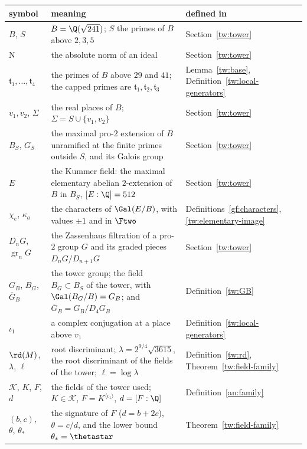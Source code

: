 \smallskip
{\small
\begin{longtable}{@{}>{\raggedright\arraybackslash}p{}>{\raggedright\arraybackslash}p{}>{\raggedright\arraybackslash}p{}@{}}
\toprule
symbol & meaning & defined in\\
\midrule\endhead
$B$, $S$ & $B=\Q(\sqrt{241})$; $S$ the primes of $B$ above $2,3,5$ & Section~\ref{tw:tower}\\
$\mathrm N$ & the absolute norm of an ideal & Section~\ref{tw:tower}\\
$\mathfrak t_1,\dots,\mathfrak t_4$ & the primes of $B$ above $29$ and $41$; the capped primes are $\mathfrak t_1,\mathfrak t_2,\mathfrak t_3$ & Lemma~\ref{tw:base}, Definition~\ref{tw:local-generators}\\
$v_1,v_2$, $\Sigma$ & the real places of $B$; $\Sigma=S\cup\{v_1,v_2\}$ & Section~\ref{tw:tower}\\
$B_S$, $G_S$ & the maximal pro-$2$ extension of $B$ unramified at the finite primes outside $S$, and its Galois group & Section~\ref{tw:tower}\\
$E$ & the Kummer field: the maximal elementary abelian $2$-extension of $B$ in $B_S$, $[E:\Q]=512$ & Section~\ref{tw:tower}\\
$\chi_e$, $\kappa_a$ & the characters of $\Gal(E/B)$, with values $\pm1$ and in $\Ftwo$ & Definitions~\ref{gf:characters}, \ref{tw:elementary-image}\\
$D_nG$, $\operatorname{gr}_nG$ & the Zassenhaus filtration of a pro-$2$ group $G$ and its graded pieces $D_nG/D_{n+1}G$ & Section~\ref{tw:tower}\\
$G_B$, $B_G$, $\overline G_B$ & the tower group; the field $B_G\subset B_S$ of the tower, with $\Gal(B_G/B)=G_B$; and $\overline G_B=G_B/D_4G_B$ & Definition~\ref{tw:GB}\\
$\iota_1$ & a complex conjugation at a place above $v_1$ & Definition~\ref{tw:local-generators}\\
$\rd(M)$, $\lambda$, $\ell$ & root discriminant; $\lambda=2^{9/4}\sqrt{3615}$, the root discriminant of the fields of the tower; $\ell=\log\lambda$ & Definition~\ref{tw:rd}, Theorem~\ref{tw:field-family}\\
$\mathcal K$, $K$, $F$, $d$ & the fields of the tower used; $K\in\mathcal K$, $F=K^{\langle\iota_1\rangle}$, $d=[F:\Q]$ & Definition~\ref{an:family}\\
$(b,c)$, $\theta$, $\theta_*$ & the signature of $F$ ($d=b+2c$), $\theta=c/d$, and the lower bound $\theta_*=\thetastar$ & Theorem~\ref{tw:field-family}\\

\end{longtable}}
